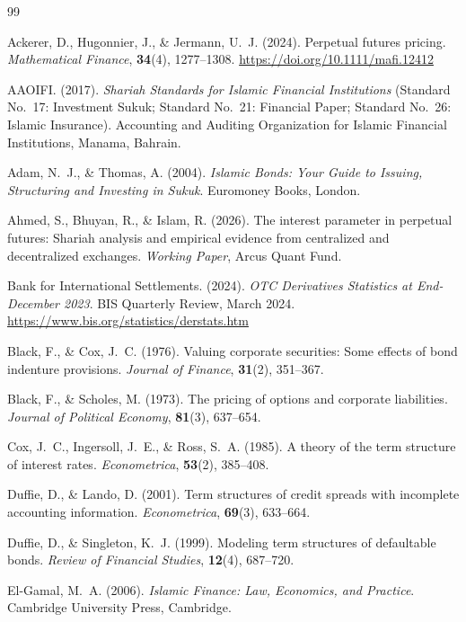 \documentclass[10pt,twocolumn]{article}
\theoremstyle{plain}
\theoremstyle{definition}
\begin{document}
\begin{thebibliography}{99}

Ackerer, D., Hugonnier, J., \& Jermann, U.~J. (2024).
Perpetual futures pricing.
\textit{Mathematical Finance}, \textbf{34}(4), 1277--1308.
\url{https://doi.org/10.1111/mafi.12412}

AAOIFI. (2017).
\textit{Shariah Standards for Islamic Financial Institutions}
(Standard No.~17: Investment Sukuk; Standard No.~21: Financial
Paper; Standard No.~26: Islamic Insurance).
Accounting and Auditing Organization for Islamic Financial
Institutions, Manama, Bahrain.

Adam, N.~J., \& Thomas, A. (2004).
\textit{Islamic Bonds: Your Guide to Issuing, Structuring and
Investing in Sukuk}.
Euromoney Books, London.

Ahmed, S., Bhuyan, R., \& Islam, R. (2026).
The interest parameter in perpetual futures: Shariah analysis
and empirical evidence from centralized and decentralized exchanges.
\textit{Working Paper}, Arcus Quant Fund.

Bank for International Settlements. (2024).
\textit{OTC Derivatives Statistics at End-December 2023}.
BIS Quarterly Review, March 2024.
\url{https://www.bis.org/statistics/derstats.htm}

Black, F., \& Cox, J.~C. (1976).
Valuing corporate securities: Some effects of bond indenture
provisions.
\textit{Journal of Finance}, \textbf{31}(2), 351--367.

Black, F., \& Scholes, M. (1973).
The pricing of options and corporate liabilities.
\textit{Journal of Political Economy}, \textbf{81}(3), 637--654.

Cox, J.~C., Ingersoll, J.~E., \& Ross, S.~A. (1985).
A theory of the term structure of interest rates.
\textit{Econometrica}, \textbf{53}(2), 385--408.

Duffie, D., \& Lando, D. (2001).
Term structures of credit spreads with incomplete accounting
information.
\textit{Econometrica}, \textbf{69}(3), 633--664.

Duffie, D., \& Singleton, K.~J. (1999).
Modeling term structures of defaultable bonds.
\textit{Review of Financial Studies}, \textbf{12}(4), 687--720.

El-Gamal, M.~A. (2006).
\textit{Islamic Finance: Law, Economics, and Practice}.
Cambridge University Press, Cambridge.


\end{thebibliography}
\end{document}
